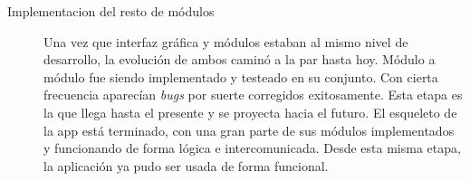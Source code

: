 \begin{description}
	\item[Implementacion del resto de módulos] Una vez que interfaz gráfica y módulos estaban al mismo nivel de desarrollo, la evolución de ambos caminó a la par hasta hoy. Módulo a módulo fue siendo implementado y testeado en su conjunto. Con cierta frecuencia aparecían \textit{bugs} por suerte corregidos exitosamente. Esta etapa es la que llega hasta el presente y se proyecta hacia el futuro. El esqueleto de la app está terminado, con una gran parte de sus módulos implementados y funcionando de forma lógica e intercomunicada. Desde esta misma etapa, la aplicación ya pudo ser usada de forma funcional.
\end{description}




